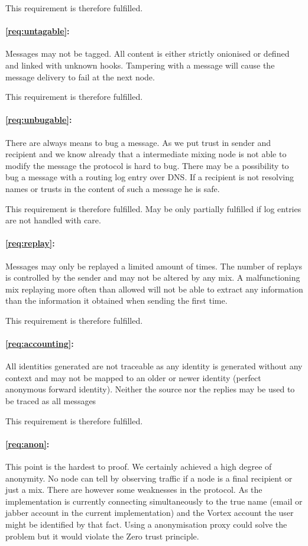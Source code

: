 This requirement is therefore fulfilled.

\paragraph*{\ref{req:untagable}:} 
Messages may not be tagged. All content is either strictly onionised or defined and linked with unknown hooks. Tampering with a message will cause the message delivery to fail at the next node.

This requirement is therefore fulfilled.
 
\paragraph*{\ref{req:unbugable}:} 
There are always means to bug a message. As we put trust in sender and recipient and we know already that a intermediate mixing node is not able to modify the message the protocol is hard to bug. There may be a possibility to bug a message with a routing log entry over DNS. If a recipient is not resolving names or trusts in the content of such a message he is safe.

This requirement is therefore fulfilled. May be only partially fulfilled if log entries are not handled with care.

\paragraph*{\ref{req:replay}:} Messages may only be replayed a limited amount of times. The number of replays is controlled by the sender and may not be altered by any mix. A malfunctioning mix replaying more often than allowed will not be able to extract any information than the information it obtained when sending the first time. 

This requirement is therefore fulfilled.

\paragraph*{\ref{req:accounting}:} 
All identities generated are not traceable as any identity is generated without any context and may not be mapped to an older or newer identity (perfect anonymous forward identity). Neither the source nor the replies may be used to be traced as all messages 

This requirement is therefore fulfilled.

\paragraph*{\ref{req:anon}:} This point is the hardest to proof. We certainly achieved a high degree of anonymity. No node can tell by observing traffic if a node is a final recipient or just a mix. There are however some weaknesses in the protocol. As the implementation is currently connecting simultaneously to the true name (email or jabber account in the current implementation) and the Vortex account the user might be identified by that fact. Using a anonymisation proxy could solve the problem but it would violate the Zero trust principle.


